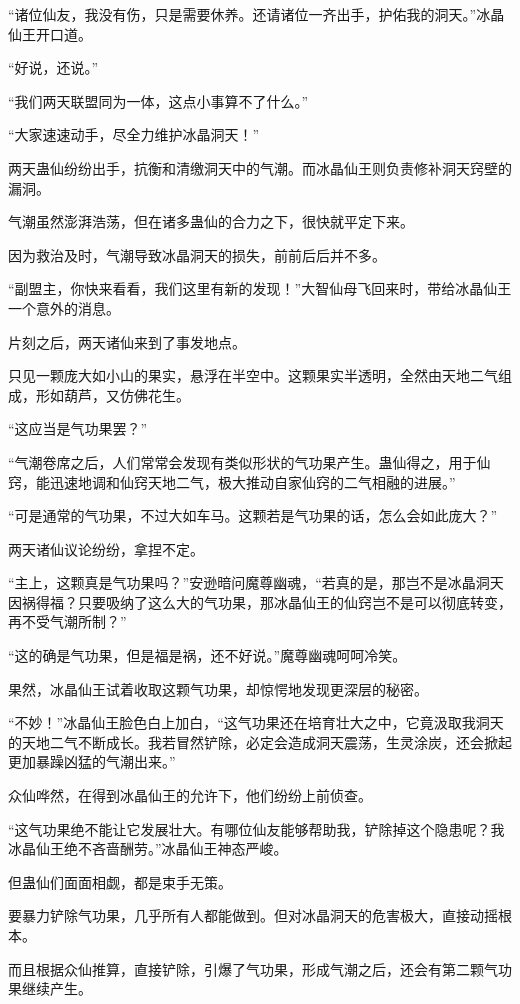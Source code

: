 \begin{this_body}
“诸位仙友，我没有伤，只是需要休养。还请诸位一齐出手，护佑我的洞天。”冰晶仙王开口道。

“好说，还说。”

“我们两天联盟同为一体，这点小事算不了什么。”

“大家速速动手，尽全力维护冰晶洞天！”

两天蛊仙纷纷出手，抗衡和清缴洞天中的气潮。而冰晶仙王则负责修补洞天窍壁的漏洞。

气潮虽然澎湃浩荡，但在诸多蛊仙的合力之下，很快就平定下来。

因为救治及时，气潮导致冰晶洞天的损失，前前后后并不多。

“副盟主，你快来看看，我们这里有新的发现！”大智仙母飞回来时，带给冰晶仙王一个意外的消息。

片刻之后，两天诸仙来到了事发地点。

只见一颗庞大如小山的果实，悬浮在半空中。这颗果实半透明，全然由天地二气组成，形如葫芦，又仿佛花生。

“这应当是气功果罢？”

“气潮卷席之后，人们常常会发现有类似形状的气功果产生。蛊仙得之，用于仙窍，能迅速地调和仙窍天地二气，极大推动自家仙窍的二气相融的进展。”

“可是通常的气功果，不过大如车马。这颗若是气功果的话，怎么会如此庞大？”

两天诸仙议论纷纷，拿捏不定。

“主上，这颗真是气功果吗？”安逊暗问魔尊幽魂，“若真的是，那岂不是冰晶洞天因祸得福？只要吸纳了这么大的气功果，那冰晶仙王的仙窍岂不是可以彻底转变，再不受气潮所制？”

“这的确是气功果，但是福是祸，还不好说。”魔尊幽魂呵呵冷笑。

果然，冰晶仙王试着收取这颗气功果，却惊愕地发现更深层的秘密。

“不妙！”冰晶仙王脸色白上加白，“这气功果还在培育壮大之中，它竟汲取我洞天的天地二气不断成长。我若冒然铲除，必定会造成洞天震荡，生灵涂炭，还会掀起更加暴躁凶猛的气潮出来。”

众仙哗然，在得到冰晶仙王的允许下，他们纷纷上前侦查。

“这气功果绝不能让它发展壮大。有哪位仙友能够帮助我，铲除掉这个隐患呢？我冰晶仙王绝不吝啬酬劳。”冰晶仙王神态严峻。

但蛊仙们面面相觑，都是束手无策。

要暴力铲除气功果，几乎所有人都能做到。但对冰晶洞天的危害极大，直接动摇根本。

而且根据众仙推算，直接铲除，引爆了气功果，形成气潮之后，还会有第二颗气功果继续产生。


\end{this_body}
